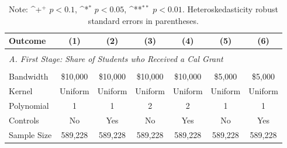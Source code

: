 \documentclass[12pt,letterpaper,oneside]{book}
\newcommand{\basepath}{g:/My Drive/Grad School}
\newcommand{\basepath}{basepath}
\begin{document}
\begin{table}[h!]\centering
    \def\sym#1{\ifmmode^{#1}\else\(^{#1}\)\fi}
    \caption{Cal Grant Time Heterogeneity in First Stage Test\label{tab:first_ttest}}
    \begin{tabular}{l*{6}{c}}
        \hline\hline
        Outcome&\multicolumn{1}{c}{(1)}&\multicolumn{1}{c}{(2)}&\multicolumn{1}{c}{(3)}&\multicolumn{1}{c}{(4)}&\multicolumn{1}{c}{(5)}&\multicolumn{1}{c}{(6)}\\
        \hline
        &&&&&&\\
        \multicolumn{7}{l}{\textit{A. First Stage: Share of Students who Received a Cal Grant}} \\ [0.5em]
         [0.5em]


        &&&&&&\\

        \hline
        Bandwidth & \$10,000       &   \$10,000        &   \$10,000        &   \$10,000       &   \$5,000        &   \$5,000        \\
        Kernel&   Uniform      &   Uniform        &   Uniform        &   Uniform       &   Uniform       &   Uniform       \\
        Polynomial&   1       &   1        &   2        &   2       &   1       &   1       \\
        Controls&   No       &   Yes        &   No        &   Yes        &   No        &   Yes        \\
        Sample Size      &   589,228     &    589,228      &      589,228       &   589,228    &   589,228      &  589,228       \\
        \hline
    \end{tabular}
    \caption*{\footnotesize Note: \sym{+} \(p<0.1\), \sym{*} \(p<0.05\), \sym{**} \(p<0.01\). Heteroskedasticity robust standard errors in parentheses.}
\end{table}



\clearpage
\end{document}
